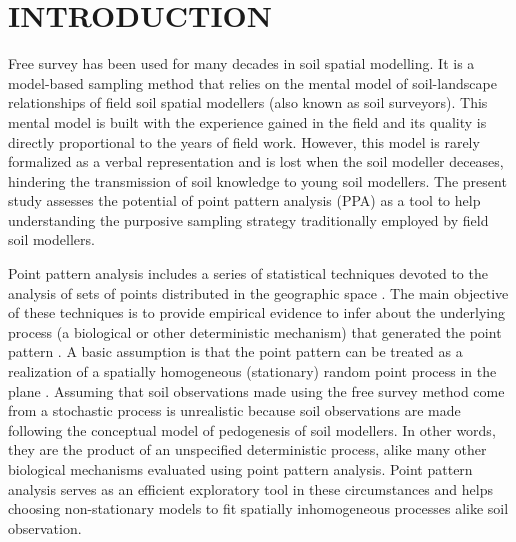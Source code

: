 \formatchapter

\section{INTRODUCTION}

Free survey has been used for many decades in soil spatial modelling. It is a model-based sampling method that 
relies on the mental model of soil-landscape relationships of field soil spatial modellers (also known as 
soil surveyors). This mental model is built with the experience gained in the field and its quality is 
directly proportional to the years of field work. However, this model is rarely formalized as a verbal 
representation and is lost when the soil modeller deceases, hindering the transmission of soil knowledge to 
young soil modellers. The present study assesses the potential of point pattern analysis (PPA) as a tool to 
help understanding the purposive sampling strategy traditionally employed by field soil modellers.

Point pattern analysis includes a series of statistical techniques devoted to the analysis of sets of points 
distributed in the geographic space \cite{Diggle2003}. The main objective of these techniques is to provide 
empirical evidence to infer about the underlying process (a biological or other deterministic mechanism) that 
generated the point pattern \cite{BivandEtAl2008}. A basic assumption is that the point pattern can be treated 
as a realization of a spatially homogeneous (stationary) random point process in the plane \cite{Diggle2003}. 
Assuming that soil observations made using the free survey method come from a stochastic process is unrealistic 
because soil observations are made following the conceptual model of pedogenesis of soil modellers. In other 
words, they are the product of an unspecified deterministic process, alike many other biological mechanisms 
evaluated using point pattern analysis. Point pattern analysis serves as an efficient exploratory tool in these 
circumstances and helps choosing non-stationary models to fit spatially inhomogeneous processes 
\cite{Baddeley2010} alike soil observation.

